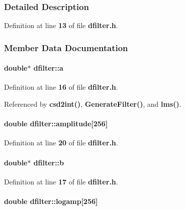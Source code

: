 \subsubsection{Detailed Description}


Definition at line {\bf 13} of file {\bf dfilter.\+h}.



\subsubsection{Member Data Documentation}
\paragraph[{a}]{\setlength{\rightskip}{0pt plus 5cm}double$\ast$ dfilter\+::a}\label{structdfilter_af6924cb5627afe62f76323182723f978}


Definition at line {\bf 16} of file {\bf dfilter.\+h}.



Referenced by {\bf csd2int()}, {\bf Generate\+Filter()}, and {\bf lms()}.

\paragraph[{amplitude}]{\setlength{\rightskip}{0pt plus 5cm}double dfilter\+::amplitude[256]}\label{structdfilter_afce5f85351b1250f974f9f34f0d9177c}


Definition at line {\bf 20} of file {\bf dfilter.\+h}.

\paragraph[{b}]{\setlength{\rightskip}{0pt plus 5cm}double$\ast$ dfilter\+::b}\label{structdfilter_aee8e0e3b89088bb22e45e1ebf17aca26}


Definition at line {\bf 17} of file {\bf dfilter.\+h}.

\paragraph[{logamp}]{\setlength{\rightskip}{0pt plus 5cm}double dfilter\+::logamp[256]}\label{structdfilter_a505e15bb81d84cd7b603530a933ea0e2}


